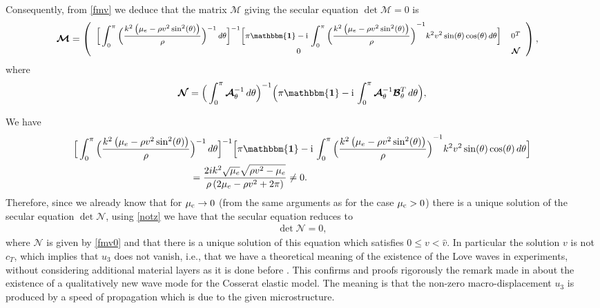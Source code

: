 \documentclass[10pt]{article}
\newcommand{\id}{{\mathbf{\mathbbm{1}}}}
\def\dd{\displaystyle}
\def\dd{\displaystyle}
\begin{document}
Consequently, from \eqref{fmv} we deduce that the matrix $\boldsymbol{\mathcal{M}}$ giving the secular equation
$
	\det \boldsymbol{\mathcal{M}}=0
$
is
\begin{align}
	\boldsymbol{\mathcal{M}}&=
	\begin{footnotesize}\left(
		\begin{array}{ccc}
		 \Big[\dd\int_{0}^{\pi}	 	\Big(\frac{k^2 \left(\mu _e-\rho  v^2 \sin ^2(\theta )\right)}{\rho }\Big) ^{-1}\, d\theta\Big]^{-1}\Big[\pi\id-  {\rm i}\, \int_{0}^{\pi}    {	\Big(\frac{k^2 \left(\mu _e-\rho  v^2 \sin ^2(\theta )\right)}{\rho }\Big)} ^{-1}   k^2 v^2 \sin (\theta ) \cos (\theta )\, d\theta\Big]& 0^T \\
			0 &  \boldsymbol{\mathcal{N}} 
		\end{array}
		\right)\end{footnotesize},
\end{align}
where
	\begin{align}\label{fmv0}
	\boldsymbol{\mathcal{N}}=\Big(\int_{0}^{\pi}	  \boldsymbol {\mathcal{A}}_  { \theta} ^{-1}\, d\theta\Big)^{-1}\Big(\pi\id-  {\rm i}\, \int_{0}^{\pi}   \boldsymbol{\mathcal{A}}_  { \theta} ^{-1}   {   \boldsymbol{\mathcal{B}}}_\theta  ^T\, d\theta\Big),
\end{align}

We have
\begin{align}\label{notz}
\Big[\dd\int_{0}^{\pi}	 	\Big(\frac{k^2 \left(\mu _e-\rho  v^2 \sin ^2(\theta )\right)}{\rho }&\Big) ^{-1}\, d\theta\Big]^{-1}\Big[\pi\id-  {\rm i}\, \int_{0}^{\pi}    {	\Big(\frac{k^2 \left(\mu _e-\rho  v^2 \sin ^2(\theta )\right)}{\rho }\Big)} ^{-1}   k^2 v^2 \sin (\theta ) \cos (\theta )\, d\theta\Big]\\ &=	\frac{2 i k^2 \sqrt{\mu _e} \sqrt{\rho  v^2-\mu _e}}{\rho  \left(2 \mu _e-\rho  v^2+2 \pi \right)}\neq 0.\notag
\end{align}
Therefore, since we already know that for $\mu_{\rm c}\to 0$ (from the same arguments as for the case $\mu_{\rm c}>0$) there is a unique solution of the secular equation $\det \boldsymbol{\mathcal{N}}$, using \eqref{notz} we have that the secular equation reduces to 
\begin{align}
	\det \boldsymbol{\mathcal{N}}=0,
	\end{align}
	where  $\boldsymbol{\mathcal{N}}$ is given by \eqref{fmv0} and that there is a unique solution of this equation which satisfies $0\leq v<\widehat{v}$. In particular the solution $v$ is not $c_T$, which implies that $u_3$ does not vanish, i.e., that we have a theoretical meaning of the existence of the Love waves in experiments, without considering additional material layers as it is done before \cite{Achenbach}.  {This confirms and proofs rigorously  the remark made in  \cite{kulesh2009problem,Kulesh1,Kulesh2} about the existence of a qualitatively new wave mode   for the  Cosserat elastic model.}  The meaning is that the non-zero macro-displacement $u_3$ is produced by a speed of propagation which is due to the given microstructure.
		
\end{document}
